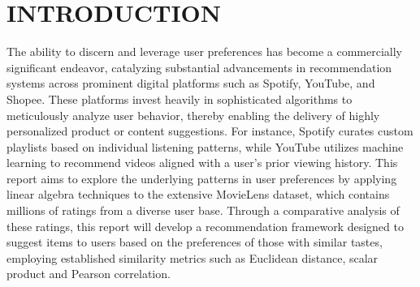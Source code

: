 \fontsize{13}{14}\selectfont
\section{INTRODUCTION}

The ability to discern and leverage user preferences has become a commercially significant endeavor, catalyzing substantial advancements in recommendation systems across prominent digital platforms such as Spotify, YouTube, and Shopee. These platforms invest heavily in sophisticated algorithms to meticulously analyze user behavior, thereby enabling the delivery of highly personalized product or content suggestions. For instance, Spotify curates custom playlists based on individual listening patterns, while YouTube utilizes machine learning to recommend videos aligned with a user's prior viewing history. This report aims to explore the underlying patterns in user preferences by applying linear algebra techniques to the extensive MovieLens dataset, which contains millions of ratings from a diverse user base. Through a comparative analysis of these ratings, this report will develop a recommendation framework designed to suggest items to users based on the preferences of those with similar tastes, employing established similarity metrics such as Euclidean distance, scalar product and Pearson correlation.